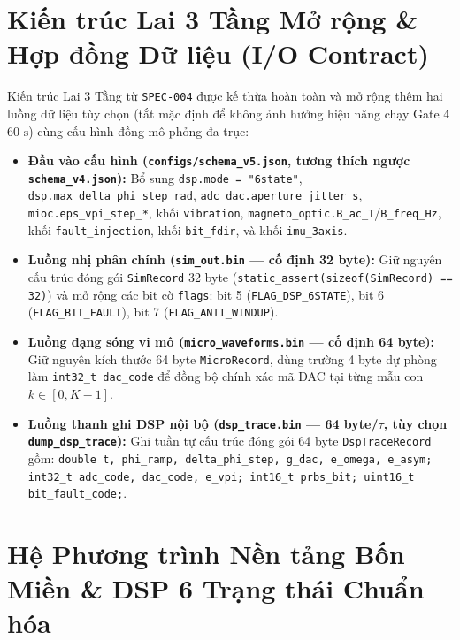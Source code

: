 \documentclass[11pt, a4paper]{article}
\begin{document}
\section{Kiến trúc Lai 3 Tầng Mở rộng \& Hợp đồng Dữ liệu (I/O Contract)}

Kiến trúc Lai 3 Tầng từ \texttt{SPEC-004} được kế thừa hoàn toàn và mở rộng thêm hai luồng dữ liệu tùy chọn (tắt mặc định để không ảnh hưởng hiệu năng chạy Gate 4 $60\text{ s}$) cùng cấu hình đồng mô phỏng đa trục:

\begin{itemize}
    \item \textbf{Đầu vào cấu hình (\texttt{configs/schema\_v5.json}, tương thích ngược \texttt{schema\_v4.json}):} Bổ sung \texttt{dsp.mode = "6state"}, \texttt{dsp.max\_delta\_phi\_step\_rad}, \texttt{adc\_dac.aperture\_jitter\_s}, \texttt{mioc.eps\_vpi\_step\_*}, khối \texttt{vibration}, \texttt{magneto\_optic.B\_ac\_T}/\texttt{B\_freq\_Hz}, khối \texttt{fault\_injection}, khối \texttt{bit\_fdir}, và khối \texttt{imu\_3axis}.
    \item \textbf{Luồng nhị phân chính (\texttt{sim\_out.bin} --- cố định 32 byte):} Giữ nguyên cấu trúc đóng gói \texttt{SimRecord} 32 byte (\texttt{static\_assert(sizeof(SimRecord) == 32)}) và mở rộng các bit cờ \texttt{flags}: bit 5 (\texttt{FLAG\_DSP\_6STATE}), bit 6 (\texttt{FLAG\_BIT\_FAULT}), bit 7 (\texttt{FLAG\_ANTI\_WINDUP}).
    \item \textbf{Luồng dạng sóng vi mô (\texttt{micro\_waveforms.bin} --- cố định 64 byte):} Giữ nguyên kích thước 64 byte \texttt{MicroRecord}, dùng trường 4 byte dự phòng làm \texttt{int32\_t dac\_code} để đồng bộ chính xác mã DAC tại từng mẫu con $k \in [0, K-1]$.
    \item \textbf{Luồng thanh ghi DSP nội bộ (\texttt{dsp\_trace.bin} --- 64 byte/$\tau$, tùy chọn \texttt{dump\_dsp\_trace}):} Ghi tuần tự cấu trúc đóng gói 64 byte \texttt{DspTraceRecord} gồm: \texttt{double t, phi\_ramp, delta\_phi\_step, g\_dac, e\_omega, e\_asym; int32\_t adc\_code, dac\_code, e\_vpi; int16\_t prbs\_bit; uint16\_t bit\_fault\_code;}.
\end{itemize}

\section{Hệ Phương trình Nền tảng Bốn Miền \& DSP 6 Trạng thái Chuẩn hóa}
\end{document}
